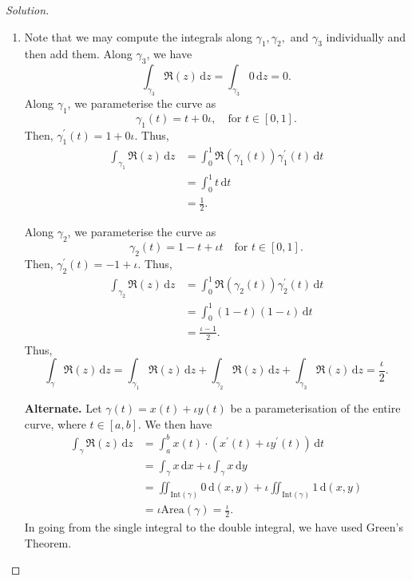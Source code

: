 \documentclass[11pt]{article}
\theoremstyle{definition}
\newenvironment{soln}{\begin{proof}[Solution]}{\end{proof}}
\begin{document}
\begin{enumerate}[leftmargin=*]
	\begin{soln}
	\phantom{hi}
	\begin{enumerate}
	    \item Note that we may compute the integrals along $\gamma_1, \gamma_2,$ and $\gamma_3$ individually and then add them. Along $\gamma_3$, we have
	    \[
	        \int_{\gamma_3}  \mathfrak{R}(z) \, \mathrm{d}z = \int_{\gamma_3} 0 \, \mathrm{d}z = 0.
	    \]
	    Along $\gamma_1$, we parameterise the curve as
	    \[
	        \gamma_1(t) = t + 0\iota, \quad \text{for } t \in [0,1].
	    \]
	    Then, $\gamma_1^{\prime}(t) = 1 + 0\iota$. Thus, 
	    \begin{align*}
	        \int_{\gamma_1} \mathfrak{R}(z) \, \mathrm{d}z &= \int_0^1 \mathfrak{R}(\gamma_1(t)) \gamma_1^{\prime}(t) \, \mathrm{d}t \\
	        &= \int_0^1 t \, \mathrm{d}t \\
	        &= \frac{1}{2}.
	    \end{align*}
	    
	    Along $\gamma_2$, we parameterise the curve as
	    \[
	        \gamma_2(t) = 1-t + \iota t \quad \text{for } t \in [0,1].
	    \]
	    Then, $\gamma_2^{\prime}(t) = -1 + \iota$. Thus,
	    \begin{align*}
	        \int_{\gamma_2} \mathfrak{R}(z) \, \mathrm{d}z &= \int_0^1 \mathfrak{R}(\gamma_2(t)) \gamma_2^{\prime}(t) \, \mathrm{d}t \\
	        &= \int_0^1 (1-t)(1-\iota) \, \mathrm{d}t \\
	        &= \frac{\iota - 1}{2}.
	    \end{align*}
	    Thus, 
	    \[
	        \int_{\gamma} \mathfrak{R}(z) \, \mathrm{d}z = \int_{\gamma_1} \mathfrak{R}(z) \, \mathrm{d}z + \int_{\gamma_2} \mathfrak{R}(z) \, \mathrm{d}z + \int_{\gamma_3} \mathfrak{R}(z) \, \mathrm{d}z = \boxed{\frac{\iota}{2}}.
	    \]
	    
	    \textbf{Alternate.} Let $\gamma(t) = x(t) + \iota y(t)$ be a parameterisation of the entire curve, where $t \in [a,b]$. We then have
	    \begin{align*}
	        \int_{\gamma} \mathfrak{R}(z) \, \mathrm{d}z &= \int_a^b x(t) \cdot (x^{\prime}(t) + \iota y^{\prime}(t) ) \, \mathrm{d}t \\
	        &= \int_{\gamma} x \, \mathrm{d}x + \iota \int_{\gamma} x \, \mathrm{d}y \\
	        &= \iint_{\text{Int}(\gamma)} 0 \, \mathrm{d}(x,y) + \iota \iint_{\text{Int}(\gamma)} 1 \, \mathrm{d}(x,y) \\
	        &= \iota \text{Area}(\gamma) = \boxed{\frac{\iota}{2}}.
	    \end{align*}
	    In going from the single integral to the double integral, we have used Green's Theorem.
	    

\end{enumerate}
\end{soln}
\end{enumerate}
\end{document}
